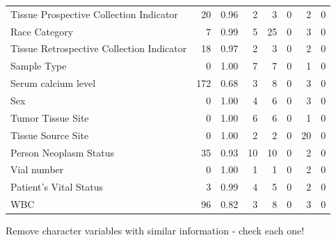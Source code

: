 \documentclass[]{article}
\newenvironment{Shaded}{\begin{snugshade}}{\end{snugshade}}
\newcommand{\KeywordTok}[1]{\textcolor[rgb]{0.13,0.29,0.53}{\textbf{#1}}}
\newcommand{\DataTypeTok}[1]{\textcolor[rgb]{0.13,0.29,0.53}{#1}}
\newcommand{\StringTok}[1]{\textcolor[rgb]{0.31,0.60,0.02}{#1}}
\newcommand{\CommentTok}[1]{\textcolor[rgb]{0.56,0.35,0.01}{\textit{#1}}}
\newcommand{\OtherTok}[1]{\textcolor[rgb]{0.56,0.35,0.01}{#1}}
\newcommand{\OperatorTok}[1]{\textcolor[rgb]{0.81,0.36,0.00}{\textbf{#1}}}
\newcommand{\NormalTok}[1]{#1}
\begin{document}
\begin{longtable}[]{@{}lrrrrrrr@{}}
Tissue Prospective Collection Indicator & 20 & 0.96 & 2 & 3 & 0 & 2 &
0\tabularnewline
Race Category & 7 & 0.99 & 5 & 25 & 0 & 3 & 0\tabularnewline
Tissue Retrospective Collection Indicator & 18 & 0.97 & 2 & 3 & 0 & 2 &
0\tabularnewline
Sample Type & 0 & 1.00 & 7 & 7 & 0 & 1 & 0\tabularnewline
Serum calcium level & 172 & 0.68 & 3 & 8 & 0 & 3 & 0\tabularnewline
Sex & 0 & 1.00 & 4 & 6 & 0 & 3 & 0\tabularnewline
Tumor Tissue Site & 0 & 1.00 & 6 & 6 & 0 & 1 & 0\tabularnewline
Tissue Source Site & 0 & 1.00 & 2 & 2 & 0 & 20 & 0\tabularnewline
Person Neoplasm Status & 35 & 0.93 & 10 & 10 & 0 & 2 & 0\tabularnewline
Vial number & 0 & 1.00 & 1 & 1 & 0 & 2 & 0\tabularnewline
Patient's Vital Status & 3 & 0.99 & 4 & 5 & 0 & 2 & 0\tabularnewline
WBC & 96 & 0.82 & 3 & 8 & 0 & 3 & 0\tabularnewline
\bottomrule
\end{longtable}

\begin{Shaded}
\end{Shaded}

Remove character variables with similar information - check each one!

\begin{Shaded}
\end{Shaded}
\end{document}
